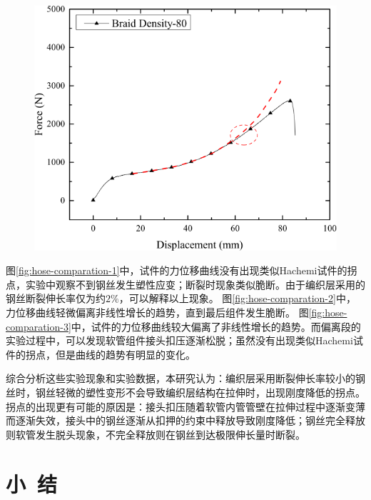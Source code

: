\begin{figure}[!htb]
{		\includegraphics[height=0.22\textheight]{figure/chap2/plasiticity-1}
		\label{fig:hose-comparation-3}}
	\label{fig:hose-comparation}
\end{figure}





图\ref{fig:hose-comparation-1}中，试件的力位移曲线没有出现类似Hachemi试件的拐点，实验中观察不到钢丝发生塑性应变；断裂时现象类似脆断。由于编织层采用的钢丝断裂伸长率仅为约$ 2\% $，可以解释以上现象。
图\ref{fig:hose-comparation-2}中，力位移曲线轻微偏离非线性增长的趋势，直到最后组件发生脆断。
图\ref{fig:hose-comparation-3}中，试件的力位移曲线较大偏离了非线性增长的趋势。而偏离段的实验过程中，可以发现软管组件接头扣压逐渐松脱；虽然没有出现类似Hachemi试件的拐点，但是曲线的趋势有明显的变化。

综合分析这些实验现象和实验数据，本研究认为：编织层采用断裂伸长率较小的钢丝时，钢丝轻微的塑性变形不会导致编织层结构在拉伸时，出现刚度降低的拐点。拐点的出现更有可能的原因是：接头扣压随着软管内管管壁在拉伸过程中逐渐变薄而逐渐失效，接头中的钢丝逐渐从扣押的约束中释放导致刚度降低；钢丝完全释放则软管发生脱头现象，不完全释放则在钢丝到达极限伸长量时断裂。



\section{小~结}
